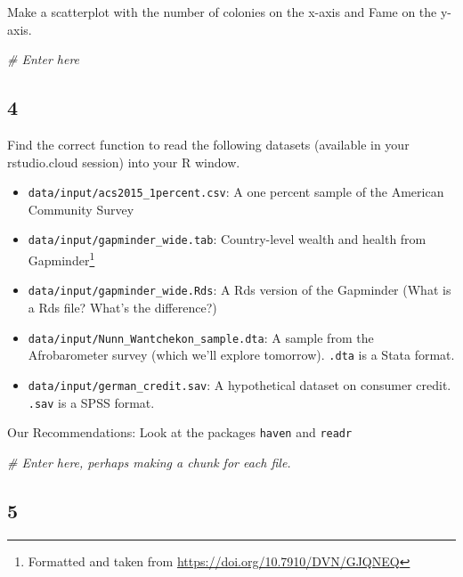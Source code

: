 \documentclass[
]{book}
\newenvironment{Shaded}{\begin{snugshade}}{\end{snugshade}}
\newcommand{\CommentTok}[1]{\textcolor[rgb]{0.56,0.35,0.01}{\textit{#1}}}
\providecommand{\tightlist}{%
  \setlength{\itemsep}{0pt}\setlength{\parskip}{0pt}}
\theoremstyle{definition}
\theoremstyle{definition}
\theoremstyle{definition}
\theoremstyle{remark}
\begin{document}
Make a scatterplot with the number of colonies on the x-axis and Fame on the y-axis.

\begin{Shaded}
\begin{Highlighting}[]
\CommentTok{\# Enter here}
\end{Highlighting}
\end{Shaded}

\hypertarget{section-3}{%
\subsection*{4}\label{section-3}}

Find the correct function to read the following datasets (available in your rstudio.cloud session) into your R window.

\begin{itemize}
\tightlist
\item
  \texttt{data/input/acs2015\_1percent.csv}: A one percent sample of the American Community Survey
\item
  \texttt{data/input/gapminder\_wide.tab}: Country-level wealth and health from Gapminder\footnote{Formatted and taken from \url{https://doi.org/10.7910/DVN/GJQNEQ}}
\item
  \texttt{data/input/gapminder\_wide.Rds}: A Rds version of the Gapminder (What is a Rds file? What's the difference?)
\item
  \texttt{data/input/Nunn\_Wantchekon\_sample.dta}: A sample from the Afrobarometer survey (which we'll explore tomorrow). \texttt{.dta} is a Stata format.
\item
  \texttt{data/input/german\_credit.sav}: A hypothetical dataset on consumer credit. \texttt{.sav} is a SPSS format.
\end{itemize}

Our Recommendations: Look at the packages \texttt{haven} and \texttt{readr}

\begin{Shaded}
\begin{Highlighting}[]
\CommentTok{\# Enter here, perhaps making a chunk for each file.}
\end{Highlighting}
\end{Shaded}

\hypertarget{section-4}{%
\subsection*{5}\label{section-4}}
\end{document}

